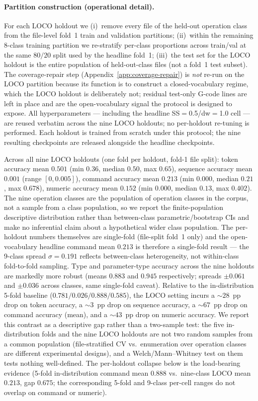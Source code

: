 \documentclass[sensors,article,submit,moreauthors,pdftex]{Definitions/mdpi}
\begin{document}
\paragraph{Partition construction (operational detail).} For each LOCO holdout we (i)~remove every file of the held-out operation class from the file-level fold~1 train and validation partitions; (ii)~within the remaining $8$-class training partition we re-stratify per-class proportions across train/val at the same $80/20$ split used by the headline fold~1; (iii)~the test set for the LOCO holdout is the entire population of held-out-class files (not a fold~1 test subset). The coverage-repair step (Appendix~\ref{app:coverage-repair}) is \emph{not} re-run on the LOCO partition because its function is to construct a closed-vocabulary regime, which the LOCO holdout is deliberately not; residual test-only G-code lines are left in place and are the open-vocabulary signal the protocol is designed to expose. All hyperparameters --- including the headline SS$=$0.5/dw$=$1.0 cell --- are reused verbatim across the nine LOCO holdouts; no per-holdout re-tuning is performed. Each holdout is trained from scratch under this protocol; the nine resulting checkpoints are released alongside the headline checkpoints.

Across all nine LOCO holdouts (one fold per holdout, fold-1 file split): token accuracy mean $0.501$ (min $0.36$, median $0.50$, max $0.65$), sequence accuracy mean $0.001$ (range $[0, 0.005]$), command accuracy mean $0.213$ (min $0.000$, median $0.21$, max $0.678$), numeric accuracy mean $0.152$ (min $0.000$, median $0.13$, max $0.402$). The nine operation classes are the population of operation classes in the corpus, not a sample from a class population, so we report the finite-population descriptive distribution rather than between-class parametric/bootstrap CIs and make no inferential claim about a hypothetical wider class population. The per-holdout numbers themselves are single-fold (file-split fold~1 only) and the open-vocabulary headline command mean $0.213$ is therefore a single-fold result --- the 9-class spread $\sigma = 0.191$ reflects between-class heterogeneity, not within-class fold-to-fold sampling. Type and parameter-type accuracy across the nine holdouts are markedly more robust (means $0.883$ and $0.945$ respectively; spreads $\pm 0.061$ and $\pm 0.036$ across classes, same single-fold caveat). Relative to the in-distribution 5-fold baseline ($0.781 / 0.026 / 0.888 / 0.585$), the LOCO setting incurs a $\sim$$28$~pp drop on token accuracy, a $\sim$$3$~pp drop on sequence accuracy, a $\sim$$67$~pp drop on command accuracy (mean), and a $\sim$$43$~pp drop on numeric accuracy. We report this contrast as a descriptive gap rather than a two-sample test: the five in-distribution folds and the nine LOCO holdouts are not two random samples from a common population (file-stratified CV vs.\ enumeration over operation classes are different experimental designs), and a Welch/Mann--Whitney test on them tests nothing well-defined. The per-holdout collapse below is the load-bearing evidence (5-fold in-distribution command mean $0.888$ vs.\ nine-class LOCO mean $0.213$, gap $0.675$; the corresponding 5-fold and 9-class per-cell ranges do not overlap on command or numeric).
\end{document}
